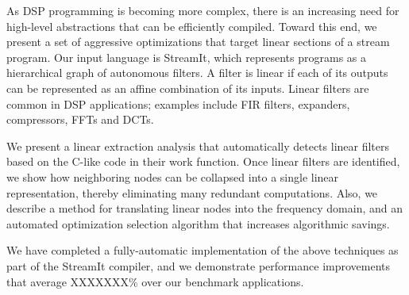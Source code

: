 As DSP programming is becoming more complex, there is an increasing
need for high-level abstractions that can be efficiently compiled.
Toward this end, we present a set of aggressive optimizations that
target linear sections of a stream program.  Our input language is
StreamIt, which represents programs as a hierarchical graph of
autonomous filters.  A filter is linear if each of its outputs can be
represented as an affine combination of its inputs.  Linear filters
are common in DSP applications; examples include FIR filters,
expanders, compressors, FFTs and DCTs.

We present a linear extraction analysis that automatically detects
linear filters based on the C-like code in their work function.
Once linear filters are identified, we show how neighboring nodes can
be collapsed into a single linear representation, thereby eliminating
many redundant computations.  Also, we describe a method for
translating linear nodes into the frequency domain, and an automated 
optimization selection algorithm that increases algorithmic savings.

We have completed a fully-automatic implementation of the above
techniques as part of the StreamIt compiler, and we demonstrate
performance improvements that average XXXXXXX\% over our benchmark
applications.



